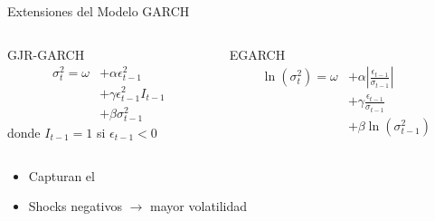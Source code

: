 \begin{frame}{Extensiones del Modelo GARCH}
    \begin{columns}
        \begin{column}{0.5\textwidth}
            \begin{block}{GJR-GARCH}
                \begin{align}
                    \sigma_t^2 = \omega &+ \alpha \epsilon_{t-1}^2 \\
                    &+ \gamma \epsilon_{t-1}^2 I_{t-1} \\
                    &+ \beta \sigma_{t-1}^2
                \end{align}
                donde $I_{t-1} = 1$ si $\epsilon_{t-1} < 0$
            \end{block}
        \end{column}
        
        \begin{column}{0.5\textwidth}
            \begin{block}{EGARCH}
                \begin{align}
                    \ln(\sigma_t^2) = \omega &+ \alpha \left| \frac{\epsilon_{t-1}}{\sigma_{t-1}} \right| \\
                    &+ \gamma \frac{\epsilon_{t-1}}{\sigma_{t-1}} \\
                    &+ \beta \ln(\sigma_{t-1}^2)
                \end{align}
            \end{block}
        \end{column}
    \end{columns}
    
    \vspace{1em}
    
    \begin{itemize}
        \item<2-> Capturan el 
        \item<3-> Shocks negativos $\rightarrow$ mayor volatilidad
    \end{itemize}
\end{frame}
